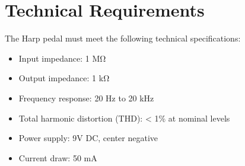 \chapter{Technical Requirements}

The Harp pedal must meet the following technical specifications:
\begin{itemize}
\item Input impedance: 1 MΩ
\item Output impedance: 1 kΩ
\item Frequency response: 20 Hz to 20 kHz
\item Total harmonic distortion (THD): < 1\% at nominal levels
\item Power supply: 9V DC, center negative
\item Current draw: 50 mA
\end{itemize}
